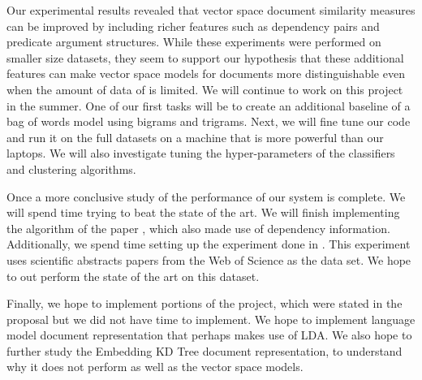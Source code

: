 \documentclass[11pt]{article}
\begin{document}
Our experimental results revealed that vector space document similarity measures can be improved by including richer features such as dependency pairs and predicate argument structures. While these experiments were performed on smaller size datasets, they seem to support our hypothesis that these additional features can make vector space models for documents more distinguishable even when the amount of data of is limited. We will continue to work on this project in the summer. One of our first tasks will be to create an additional baseline of a bag of words model using bigrams and trigrams. Next, we will fine tune our code and run it on the full datasets on a machine that is more powerful than our laptops. We will also investigate tuning the hyper-parameters of the classifiers and clustering algorithms. 

Once a more conclusive study of the performance of our system is complete. We will spend time trying to beat the state of the art. We will finish implementing the algorithm of the paper \cite{Nastase2007}, which also made use of dependency information. Additionally, we spend time setting up the experiment done in \cite{Hurtado2013}. This experiment uses scientific abstracts papers from the Web of Science as the data set. We hope to out perform the state of the art on this dataset. 

Finally, we hope to implement portions of the project, which were stated in the proposal but we did not have time to implement. We hope to implement language model document representation that perhaps makes use of LDA. We also hope to further study the Embedding KD Tree document representation, to understand why it does not perform  as well as the vector space models.  


\nocite{*}



  
  
\end{document}
